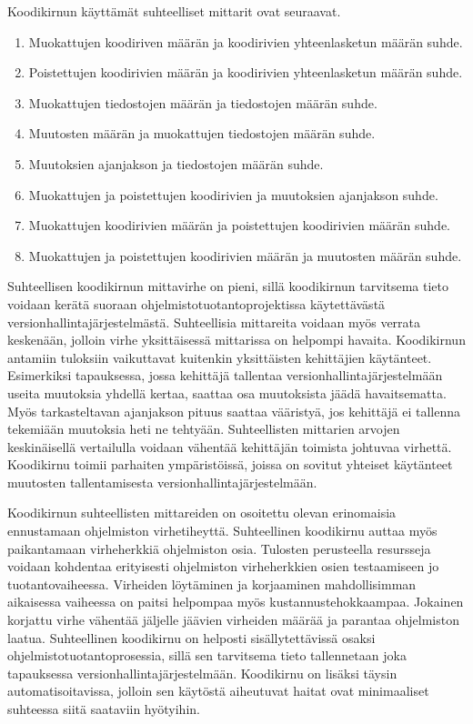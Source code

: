 \documentclass[a4paper]{article}
\begin{document}
Koodikirnun käyttämät suhteelliset mittarit ovat seuraavat.
\begin{enumerate}[itemsep=0mm]
  \item Muokattujen koodiriven määrän ja koodirivien yhteenlasketun määrän suhde.
  \item Poistettujen koodirivien määrän ja koodirivien yhteenlasketun määrän suhde.
  \item Muokattujen tiedostojen määrän ja tiedostojen määrän suhde.
  \item Muutosten määrän ja muokattujen tiedostojen määrän suhde.
  \item Muutoksien ajanjakson ja tiedostojen määrän suhde.
  \item Muokattujen ja poistettujen koodirivien ja muutoksien ajanjakson suhde.
  \item Muokattujen koodirivien määrän ja poistettujen koodirivien määrän suhde.
  \item Muokattujen ja poistettujen koodirivien määrän ja muutosten määrän suhde.
\end{enumerate}

Suhteellisen koodikirnun mittavirhe on pieni, sillä koodikirnun tarvitsema tieto voidaan kerätä suoraan ohjelmistotuotantoprojektissa käytettävästä versionhallintajärjestelmästä. Suhteellisia mittareita voidaan myös verrata keskenään, jolloin virhe yksittäisessä mittarissa on helpompi havaita. Koodikirnun antamiin tuloksiin vaikuttavat kuitenkin yksittäisten kehittäjien käytänteet. Esimerkiksi tapauksessa, jossa kehittäjä tallentaa versionhallintajärjestelmään useita muutoksia yhdellä kertaa, saattaa osa muutoksista jäädä havaitsematta. Myös tarkasteltavan ajanjakson pituus saattaa vääristyä, jos kehittäjä ei tallenna tekemiään muutoksia heti ne tehtyään. Suhteellisten mittarien arvojen keskinäisellä vertailulla voidaan vähentää kehittäjän toimista johtuvaa virhettä. Koodikirnu toimii parhaiten ympäristöissä, joissa on sovitut yhteiset käytänteet muutosten tallentamisesta versionhallintajärjestelmään. 

Koodikirnun suhteellisten mittareiden on osoitettu olevan erinomaisia ennustamaan ohjelmiston virhetiheyttä. Suhteellinen koodikirnu auttaa myös paikantamaan virheherkkiä ohjelmiston osia. Tulosten perusteella resursseja voidaan kohdentaa erityisesti ohjelmiston virheherkkien osien testaamiseen jo tuotantovaiheessa. Virheiden löytäminen ja korjaaminen mahdollisimman aikaisessa vaiheessa on paitsi helpompaa myös kustannustehokkaampaa. Jokainen korjattu virhe vähentää jäljelle jäävien virheiden määrää ja parantaa ohjelmiston laatua. Suhteellinen koodikirnu on helposti sisällytettävissä osaksi ohjelmistotuotantoprosessia, sillä sen tarvitsema tieto tallennetaan joka tapauksessa versionhallintajärjestelmään. Koodikirnu on lisäksi täysin automatisoitavissa, jolloin sen käytöstä aiheutuvat haitat ovat minimaaliset suhteessa siitä saataviin hyötyihin.
\end{document}
